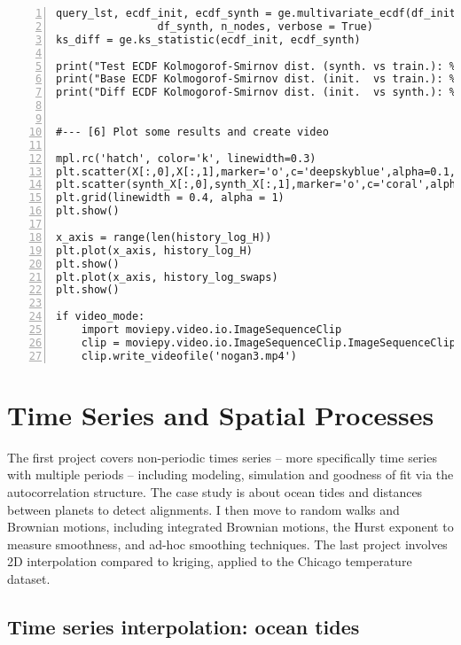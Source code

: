\documentclass[oneside,10pt]{book}
\begin{document}
\begin{lstlisting}[numbers=left]
query_lst, ecdf_init, ecdf_synth = ge.multivariate_ecdf(df_init, 
                df_synth, n_nodes, verbose = True) 
ks_diff = ge.ks_statistic(ecdf_init, ecdf_synth)

print("Test ECDF Kolmogorof-Smirnov dist. (synth. vs train.): %6.4f" %(ks))
print("Base ECDF Kolmogorof-Smirnov dist. (init.  vs train.): %6.4f" %(ks_base))
print("Diff ECDF Kolmogorof-Smirnov dist. (init.  vs synth.): %6.4f" %(ks_diff))


#--- [6] Plot some results and create video

mpl.rc('hatch', color='k', linewidth=0.3)
plt.scatter(X[:,0],X[:,1],marker='o',c='deepskyblue',alpha=0.1,s=10) 
plt.scatter(synth_X[:,0],synth_X[:,1],marker='o',c='coral',alpha=0.4,s=10, edgecolors='black',lw=0.2)
plt.grid(linewidth = 0.4, alpha = 1)
plt.show()

x_axis = range(len(history_log_H))
plt.plot(x_axis, history_log_H)
plt.show()
plt.plot(x_axis, history_log_swaps)
plt.show()

if video_mode:
    import moviepy.video.io.ImageSequenceClip
    clip = moviepy.video.io.ImageSequenceClip.ImageSequenceClip(flist, fps=6)
    clip.write_videofile('nogan3.mp4')
\end{lstlisting}





\chapter{Time Series and Spatial Processes}\label{tschj}

The first project covers non-periodic times series -- more specifically time series with multiple periods -- including modeling, simulation and 
 goodness of fit via the autocorrelation structure. The case study is about ocean tides and distances between planets to detect alignments. 
I then move to random walks and Brownian motions, including integrated Brownian motions, the Hurst exponent to measure smoothness, 
 and ad-hoc smoothing techniques. The last project involves 2D interpolation compared to kriging, applied to the Chicago temperature dataset. 



\section{Time series interpolation: ocean tides}\label{prgt43zas}
\end{document}
